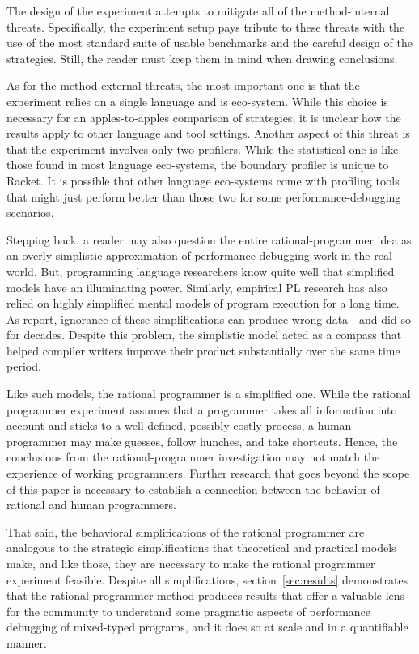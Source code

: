 The design of the experiment attempts to mitigate all of the method-internal
threats. Specifically, the experiment setup pays tribute to these threats with
the use of the most standard suite of usable benchmarks and the careful design of
the strategies.  Still, the reader must keep them in mind when drawing
conclusions.

As for the method-external threats, the most important one is that the experiment
relies on a single language and is eco-system. While this choice is necessary for
an apples-to-apples comparison of strategies, it is unclear how the results apply
to other language and tool settings. Another aspect of this threat is that the
experiment involves only two profilers. While the statistical one is like those
found in most language eco-systems, the boundary profiler is unique to Racket. It
is possible that other language eco-systems come with profiling tools that might
just perform better than those two for some performance-debugging scenarios.

Stepping back, a reader may also question the entire rational-programmer idea as
an overly simplistic approximation of performance-debugging work in the real
world. But, programming language researchers know quite well that simplified
models have an illuminating power.  Similarly, empirical PL research has also
relied on highly simplified mental models of program execution for a long
time. As \citet{mdhs:wrong-data} report, ignorance of these simplifications can
produce wrong data---and did so for decades. Despite this problem, the simplistic
model acted as a compass that helped compiler writers improve their product
substantially over the same time period.

Like such models, the rational programmer is a simplified one.  While the
rational programmer experiment assumes that a programmer takes all
information into account and sticks to a well-defined, possibly costly
process, a human programmer may make guesses, follow hunches, and take
shortcuts. Hence, the conclusions from the rational-programmer
investigation may not match the experience of working programmers. Further
research that goes beyond the scope of this paper is necessary to
establish a connection between the behavior of rational and human
programmers.  

That said, the behavioral simplifications of the rational programmer are
analogous to the strategic simplifications that theoretical and practical models
make, and like those, they are necessary to make the rational programmer
experiment feasible. Despite all simplifications, section~\ref{sec:results}
demonstrates that the rational programmer method produces results that offer a
valuable lens for the community to understand some pragmatic aspects of
performance debugging of mixed-typed programs, and it does so at scale and in a
quantifiable manner.
